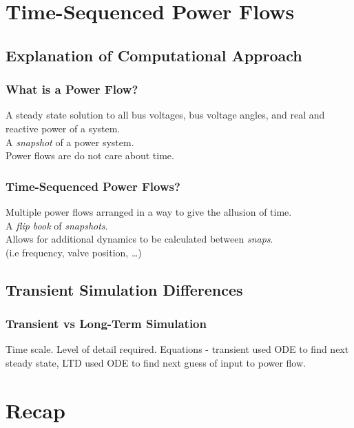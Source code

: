 \documentclass[14pt, unknownkeysallowed]{beamer}
\begin{document}
\section{Time-Sequenced Power Flows}
\subsection{Explanation of Computational Approach}
\begin{frame}
\frametitle{What is a Power Flow?}
A steady state solution to all bus voltages, bus voltage angles, and real  and reactive power of a system.\\
\vspace{1em}
A \emph{snapshot} of a power system. \\%
\vspace{1em}
Power flows are do not care about time.
\end{frame}
\begin{frame}
\frametitle{Time-Sequenced Power Flows?}
Multiple power flows arranged in a way to give the allusion of time.\\
\vspace{1em}
A \emph{flip book} of \emph{snapshots}.\\
\vspace{1em}
Allows for additional dynamics to be calculated between \emph{snaps}.\\(i.e frequency, valve position, \ldots )\\
\end{frame}
\subsection{Transient Simulation Differences}
\begin{frame}
\frametitle{Transient vs Long-Term Simulation}
Time scale.
Level of detail required.
Equations - transient used ODE to find next steady state, LTD used ODE to find next guess of input to power flow.
\end{frame}
\section{Recap}
\end{document}
